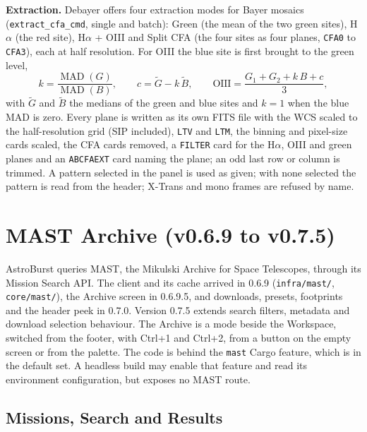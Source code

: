 \documentclass[11pt,a4paper]{article}
\newcommand{\code}[1]{\texttt{\small #1}}
\begin{document}
    \textbf{Extraction.} Debayer offers four extraction modes for Bayer mosaics (\code{extract\_cfa\_cmd}, single and batch): Green (the mean of the two green sites), H$\alpha$ (the red site), H$\alpha$ + OIII and Split CFA (the four sites as four planes, \code{CFA0} to \code{CFA3}), each at half resolution. For OIII the blue site is first brought to the green level,
    \begin{equation}
        k = \frac{\operatorname{MAD}(G)}{\operatorname{MAD}(B)}, \qquad c = \tilde{G} - k\,\tilde{B}, \qquad
        \text{OIII} = \frac{G_1 + G_2 + k\,B + c}{3},
    \end{equation}
    with $\tilde{G}$ and $\tilde{B}$ the medians of the green and blue sites and $k = 1$ when the blue MAD is zero. Every plane is written as its own FITS file with the WCS scaled to the half-resolution grid (SIP included), \code{LTV} and \code{LTM}, the binning and pixel-size cards scaled, the CFA cards removed, a \code{FILTER} card for the H$\alpha$, OIII and green planes and an \code{ABCFAEXT} card naming the plane; an odd last row or column is trimmed. A pattern selected in the panel is used as given; with none selected the pattern is read from the header; X-Trans and mono frames are refused by name.


    \section{MAST Archive (v0.6.9 to v0.7.5)}
    \label{sec:mast}

    AstroBurst queries MAST, the Mikulski Archive for Space Telescopes, through its Mission Search API. The client and its cache arrived in 0.6.9 (\code{infra/mast/}, \code{core/mast/}), the Archive screen in 0.6.9.5, and downloads, presets, footprints and the header peek in 0.7.0. Version 0.7.5 extends search filters, metadata and download selection behaviour. The Archive is a mode beside the Workspace, switched from the footer, with Ctrl+1 and Ctrl+2, from a button on the empty screen or from the palette. The code is behind the \code{mast} Cargo feature, which is in the default set. A headless build may enable that feature and read its environment configuration, but exposes no MAST route.

    \subsection{Missions, Search and Results}
\end{document}
